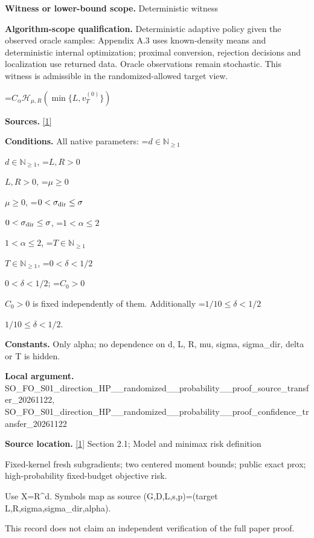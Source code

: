 \documentclass[10pt,a4paper]{article}
\newcommand{\AtlasMath}[1]{\par\begingroup\centering\setbox0=\hbox{$\displaystyle #1$}\ifdim\wd0>1.4\linewidth\typeout{ATLAS WIDE FORMULA: \the\wd0}\fi\ifdim\wd0>\linewidth\resizebox{\linewidth}{!}{\box0}\else\box0\fi\par\endgroup}
\newcommand{\AtlasInlineMath}[1]{\begingroup\setbox0=\hbox{$#1$}\ifdim\wd0>.4\linewidth\endgroup\AtlasMath{#1}\else\endgroup$#1$\fi}
\begin{document}
\textbf{Witness or lower-bound scope.} Deterministic witness



\textbf{Algorithm-scope qualification.} Deterministic adaptive policy given the observed oracle samples: Appendix A.3 uses known-density means and deterministic internal optimization; proximal conversion, rejection decisions and localization use returned data. Oracle observations remain stochastic. This witness is admissible in the randomized-allowed target view.



\AtlasMath{C_\alpha\mathcal H_{\mu,R}(\min\{L,v_T^{(0)}\})}


\textbf{Sources.} \href{https://arxiv.org/html/2610.00260v2}{[1]}



\textbf{Conditions.} All native parameters: \AtlasInlineMath{d\in\mathbb N_{\ge1}}, \AtlasInlineMath{L,R>0}, \AtlasInlineMath{\mu\ge0}, \AtlasInlineMath{0<\sigma_{\rm dir}\le\sigma}, \AtlasInlineMath{1<\alpha\le2}, \AtlasInlineMath{T\in\mathbb N_{\ge1}}, \AtlasInlineMath{0<\delta<1/2}; \AtlasInlineMath{C_0>0} is fixed independently of them. Additionally \AtlasInlineMath{1/10\le\delta<1/2}.



\textbf{Constants.} Only alpha; no dependence on d, L, R, mu, sigma, sigma\_dir, delta or T is hidden.



\textbf{Local argument.} SO\_FO\_S01\_direction\_HP\_\_\allowbreak{}randomized\_\_probability\_\allowbreak{}\_proof\_source\_transfer\_2\allowbreak{}0261122, SO\_FO\_S01\_direction\_HP\_\_\allowbreak{}randomized\_\_probability\_\allowbreak{}\_proof\_confidence\_transf\allowbreak{}er\_20261122



\textbf{Source location.} \href{https://arxiv.org/html/2610.00260v2}{[1]} Section 2.1; Model and minimax risk definition



Fixed-kernel fresh subgradients; two centered moment bounds; public exact prox; high-probability fixed-budget objective risk.



Use X=R\textasciicircum{}d. Symbols map as source (G,D,L,s,p)=(target L,R,sigma,sigma\_dir,alpha).



This record does not claim an independent verification of the full paper proof.
\end{document}
